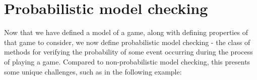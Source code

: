 \section{Probabilistic model checking}
\label{back:prob_mod_check}





Now that we have defined a model of a game, along with defining properties of that game to consider, we now define probabilistic model checking - the class of methods for verifying the probability of some event occurring during the process of playing a game. Compared to non-probabilistic model checking, this presents some unique challenges, such as in the following example:

